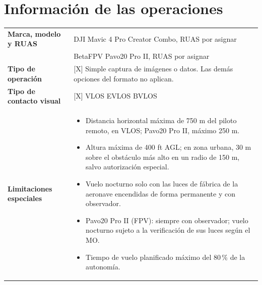 \section{Información de las operaciones}
\begin{table}[H]
    \centering
    \renewcommand{\arraystretch}{1.2}
    \begin{tabular}{|p{5.5cm}|p{9cm}|}
        \hline
        \textbf{Marca, modelo y RUAS} & DJI Mavic 4 Pro Creator Combo, RUAS por asignar \\
        & BetaFPV Pavo20 Pro II, RUAS por asignar \\ \hline
        \textbf{Tipo de operación} & [X] Simple captura de imágenes o datos. Las demás opciones del formato no aplican. \\ \hline
        \textbf{Tipo de contacto visual} & [X] VLOS \quad [\ ] EVLOS \quad [\ ] BVLOS \\ \hline
        \textbf{Limitaciones especiales} &
        \begin{minipage}[t]{8.7cm}
        \begin{itemize}\setlength\itemsep{0pt}
            \item Distancia horizontal máxima de 750 m del piloto remoto, en VLOS; Pavo20 Pro II, máximo 250 m.
            \item Altura máxima de 400 ft AGL; en zona urbana, 30 m sobre el obstáculo más alto en un radio de 150 m, salvo autorización especial.
            \item Vuelo nocturno solo con las luces de fábrica de la aeronave encendidas de forma permanente y con observador.
            \item Pavo20 Pro II (FPV): siempre con observador; vuelo nocturno sujeto a la verificación de sus luces según el MO.
            \item Tiempo de vuelo planificado máximo del 80\,\% de la autonomía.
        \end{itemize}
        \end{minipage} \\ \hline
    \end{tabular}
\end{table}

